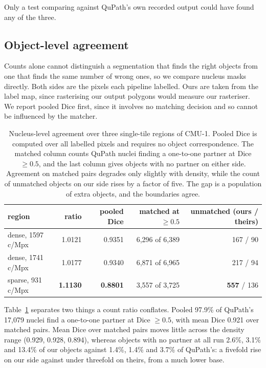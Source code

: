 \documentclass[11pt,a4paper]{article}
\begin{document}
Only a test comparing against QuPath's own recorded output could have found any
of the three.

\subsection{Object-level agreement}
\label{sec:dice}

Counts alone cannot distinguish a segmentation that finds the right objects
from one that finds the same number of wrong ones, so we compare nucleus masks
directly. Both sides are the pixels each pipeline labelled. Ours are taken from
the label map, since rasterising our output polygons would measure our
rasteriser. We report pooled Dice \cite{dice1945measures} first, since it
involves no matching decision and so cannot be influenced by the matcher.

\begin{table}[t]
  \centering
  \caption{Nucleus-level agreement over three single-tile regions of CMU-1.
           Pooled Dice is computed over all labelled pixels and requires no
           object correspondence. The matched column counts QuPath nuclei
           finding a one-to-one partner at Dice $\geq 0.5$, and the last column
           gives objects with no partner on either side. Agreement on matched
           pairs degrades only slightly with density, while the count of
           unmatched objects on our side rises by a factor of five. The gap is
           a population of extra objects, and the boundaries agree.}
  \label{tab:dice}
  \small
  \begin{tabular}{lrrrr}
    \toprule
    region & ratio & pooled Dice & matched at $\geq 0.5$ & unmatched (ours / theirs) \\
    \midrule
    dense, 1597 c/Mpx  & 1.0121          & 0.9351          & 6{,}296 of 6{,}389 & 167 / 90 \\
    dense, 1741 c/Mpx  & 1.0177          & 0.9340          & 6{,}871 of 6{,}965 & 217 / 94 \\
    sparse, 931 c/Mpx  & \textbf{1.1130} & \textbf{0.8801} & 3{,}557 of 3{,}725 & \textbf{557} / 136 \\
    \bottomrule
  \end{tabular}
\end{table}

Table~\ref{tab:dice} separates two things a count ratio conflates. Pooled
97.9\% of QuPath's 17{,}079 nuclei find a one-to-one partner at Dice $\geq
0.5$, with mean Dice 0.921 over matched pairs. Mean Dice over matched pairs
moves little across the density range (0.929, 0.928, 0.894), whereas objects
with no partner at all run 2.6\%, 3.1\% and 13.4\% of our objects against
1.4\%, 1.4\% and 3.7\% of QuPath's: a fivefold rise on our side against under
threefold on theirs, from a much lower base.
\end{document}
